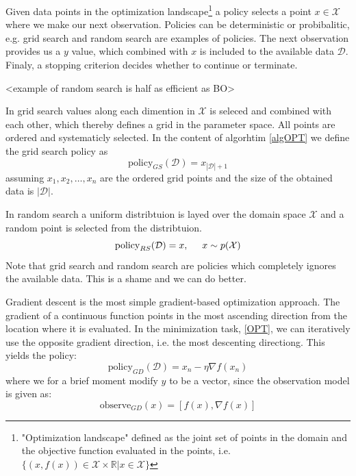 Given data points in the optimization landscape\footnote{"Optimization landscape" defined as the joint set of points in the domain and the objective function
evaluated in the points, i.e. $\{(x,f(x))\in \mathcal{X} \times \mathbb{R}| x \in \mathcal{X}\}$} 
a policy selects a point $x \in \mathcal{X}$ where we make our next observation. Policies can be deterministic or probibalitic, e.g. 
grid search and random search are examples of policies. The next observation provides us a $y$ value, which combined with $x$ is included to the 
available data $\mathcal{D}$. Finaly, a stopping criterion decides whether to continue or terminate. 

<example of random search is half as efficient as BO>


\begin{testexample}
    In grid search values along each dimention in $\mathcal{X}$ is seleced and combined with each
    other, which thereby defines a grid in the parameter space. All points are ordered and systematicly
    selected. In the content of algorhtim \ref{algOPT} we define the grid search policy as 
    $$\text{policy}_{GS}(\mathcal{D}) = x_{|\mathcal{D}|+1}$$
    assuming $x_1,x_2, \dots, x_{n}$ are the ordered grid points and the size of the obtained 
    data is $|\mathcal{D}|$. 
\end{testexample}
\begin{testexample}
    In random search a uniform distribtuion is layed over the domain space $\mathcal{X}$ and a random point
    is selected from the distribtuion. 
    $$\text{policy}_{RS}(\mathcal{D}) = x, \hspace{0.5cm} x \sim p(\mathcal{X})$$
    Note that grid search and random search are policies which completely 
    ignores the available data. This is a shame and we can do better. 
\end{testexample}

\begin{testexample}
    Gradient descent is the most simple gradient-based optimization approach. The gradient of a continuous 
    function points in the most ascending direction from the location where it is evaluated.
    In the minimization task, \eqref{OPT}, we can iteratively use the opposite gradient direction, i.e. the most 
    descenting directiong. This yields the policy:
    $$\text{policy}_{GD}(\mathcal{D}) = x_n - \eta \nabla f(x_n)$$
    where we for a brief moment modify $y$ to be a vector, since the observation model 
    is given as:
    $$\text{observe}_{GD}(x) = [f(x), \nabla f(x)]$$
\end{testexample}

